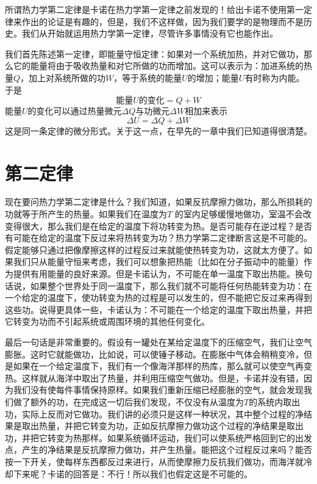 所谓热力学第二定律是卡诺在热力学第一定律之前发现的！给出卡诺不使用第一定律来作出的论证是有趣的，但是，我们不这样做，因为我们要学的是物理而不是历史。我们从开始就运用热力学第一定律，尽管许多事情没有它也能作出。

我们首先陈述第一定律，即能量守恒定律：如果对一个系统加热，并对它做功，那么它的能量将由于吸收热量和对它所做的功而增加。这可以表示为：加进系统的热量$Q$，加上对系统所做的功$W$，等于系统的能量$U$的增加；能量$U$有时称为内能。于是
\begin{equation}
    \label{Eq:I:44:1}
    \text{能量$U$的变化} = Q+W
\end{equation}
能量$U$的变化可以通过热量微元$\Delta Q$与功微元$\Delta W$相加来表示
\begin{equation}
    \label{Eq:I:44:2}
    \Delta U =\Delta Q +\Delta W
\end{equation}
这是同一条定律的微分形式。关于这一点，在早先的一章中我们已知道得很清楚。

\section{第二定律}

现在要问热力学第二定律是什么？我们知道，如果反抗摩擦力做功，那么所损耗的功就等于所产生的热量。如果我们在温度为$T$ 的室内足够缓慢地做功，室温不会改变得很大，那么我们是在给定的温度下将功转变为热。是否可能存在逆过程？是否有可能在给定的温度下反过来将热转变为功？热力学第二定律断言这是不可能的。假定能够只通过把像摩擦这样的过程反过来就能使热转变为功，这就太方便了。如果我们只从能量守恒来考虑，我们可以想象把热能（比如在分子振动中的能量）作为提供有用能量的良好来源。但是卡诺认为，不可能在单一温度下取出热能。换句话说，如果整个世界处于同一温度下，那么我们就不可能将任何热能转变为功：在一个给定的温度下，使功转变为热的过程是可以发生的，但不能把它反过来再得到这些功。说得更具体一些，卡诺认为：不可能在一个给定的温度下取出热量，并把它转变为功而不引起系统或周围环境的其他任何变化。

最后一句话是非常重要的。假设有一罐处在某给定温度下的压缩空气，我们让空气膨胀。这时它就能做功，比如说，可以使锤子移动。在膨胀中气体会稍稍变冷，但是如果在一个给定温度下，我们有一个像海洋那样的热库，那么就可以使空气再变热。这样就从海洋中取出了热量，并利用压缩空气做功。但是，卡诺并没有错，因为我们没有使每件事情保持原样。如果我们重新压缩已经膨胀的空气，就会发现我们做了额外的功，在完成这一切后我们发现，不仅没有从温度为$T$的系统内取出功，实际上反而对它做功。我们讲的必须只是这样一种状况，其中整个过程的净结果是取出热量，并把它转变为功，正如反抗摩擦力做功这个过程的净结果是取出功，并把它转变为热那样。如果系统循环运动，我们可以使系统严格回到它的出发点，产生的净结果是反抗摩擦力做功，并产生热量。能把这个过程反过来吗？能否按一下开关，使每样东西都反过来进行，从而使摩擦力反抗我们做功，而海洋就冷却下来呢？卡诺的回答是：不行！所以我们也假定这是不可能的。

